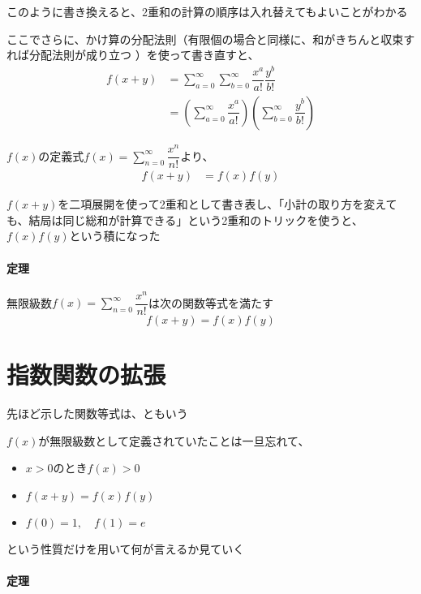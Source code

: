 \documentclass[../book_jiriki_calc]{subfiles}
\begin{document}
このように書き換えると、2重和の計算の順序は入れ替えてもよいことがわかる

\sectionline

ここでさらに、かけ算の分配法則（有限個の場合と同様に、和がきちんと収束すれば分配法則が成り立つ
）を使って書き直すと、
\begin{align}
  f(x+y) & = \sum_{a=0}^{\infty} \sum_{b=0}^{\infty} \dfrac{x^a}{a!} \dfrac{y^b}{b!}                           \\
         & = \left(\sum_{a=0}^{\infty} \dfrac{x^a}{a!}\right) \left(\sum_{b=0}^{\infty} \dfrac{y^b}{b!}\right)
\end{align}

$f(x)$の定義式$\displaystyle f(x) = \sum_{n=0}^{\infty} \dfrac{x^n}{n!}$より、
\begin{align}
  f(x+y) & = f(x)f(y)
\end{align}

$f(x+y)$を二項展開を使って2重和として書き表し、「小計の取り方を変えても、結局は同じ総和が計算できる」という2重和のトリックを使うと、$f(x)f(y)$という積になった

\sectionline

\paragraph{定理}

無限級数$\displaystyle f(x) = \sum_{n=0}^{\infty} \dfrac{x^n}{n!}$は次の関数等式を満たす
\begin{equation}
  f(x+y) = f(x)f(y)
\end{equation}

\section*{指数関数の拡張}

先ほど示した関数等式は、ともいう

\sectionline

$f(x)$が無限級数として定義されていたことは一旦忘れて、
\begin{itemize}
  \item $x>0$のとき$f(x)>0$
  \item $f(x+y)=f(x)f(y)$
  \item $f(0)=1,\quad f(1) = e$
\end{itemize}
という性質だけを用いて何が言えるか見ていく

\sectionline

\paragraph{定理}
\end{document}
